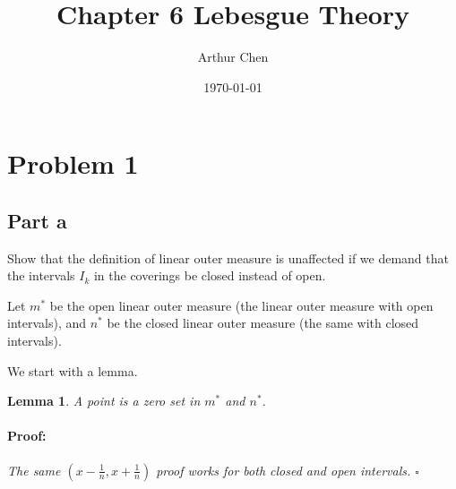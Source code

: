 \documentclass{article}
\author{Arthur Chen}
\title{Chapter 6 Lebesgue Theory}
\date{\today}
\newenvironment{proof}{\paragraph{Proof:}}{\hfill$\square$}
\newtheorem{lemma}[theorem]{Lemma}
\begin{document}
\maketitle

\section*{Problem 1}

\subsection*{Part a}

Show that the definition of linear outer measure is unaffected if we demand that the intervals $I_k$ in the coverings be closed instead of open.

Let $m^*$ be the open linear outer measure (the linear outer measure with open intervals), and $n^*$ be the closed linear outer measure (the same with closed intervals).

We start with a lemma.

\begin{lemma}
A point is a zero set in $m^*$ and $n^*$.
\begin{proof}
The same $(x - \frac{1}{n}, x + \frac{1}{n})$ proof works for both closed and open intervals.
\end{proof}
\end{lemma}
\end{document}

